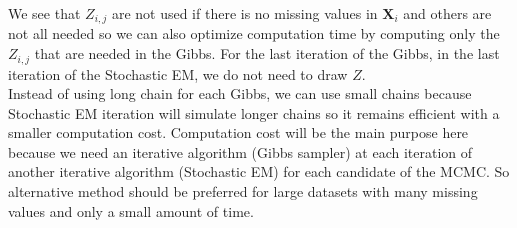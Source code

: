 \documentclass[12pt,a4paper]{report}
\begin{document}
	
	
	We see that $Z_{i,j}$ are not used if there is no missing values in $\boldsymbol{X}_i$ and others are not all needed so we can also optimize computation time by  computing only the $Z_{i,j}$ that are needed in the Gibbs.
	For the last iteration of the Gibbs, in the last iteration of the Stochastic EM, we do not need to draw $Z$.	\\
	
	Instead of using long chain for each Gibbs, we can use small chains because Stochastic EM iteration will simulate longer chains so it remains efficient with a smaller computation cost.
	Computation cost will be the main purpose here because we need an iterative algorithm (Gibbs sampler) at each iteration of another iterative algorithm (Stochastic EM) for each candidate of the MCMC.
	So alternative method should be preferred for large datasets with many missing values and only a small amount of time.\\
	

%	
%	
\end{document}
